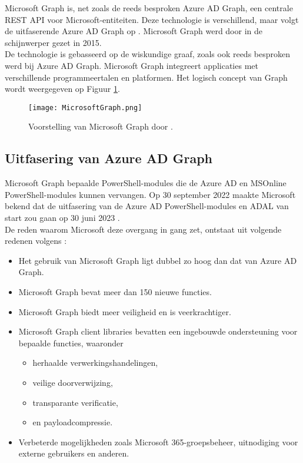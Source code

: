 Microsoft Graph is, net zoals de reeds besproken Azure \Ac{AD} Graph, een centrale \ac{REST} \ac{API} voor Microsoft-entiteiten. Deze technologie is verschillend, maar volgt de uitfaserende Azure \ac{AD} Graph op \autocite{Microsoft2023n}. Microsoft Graph werd door \textcite{Microsoft2015a} in de schijnwerper gezet in 2015. \\

De technologie is gebasseerd op de wiskundige graaf, zoals ook reeds besproken werd bij Azure \Ac{AD} Graph. Microsoft Graph integreert applicaties met verschillende programmeertalen en platformen. Het logisch concept van Graph wordt weergegeven op Figuur \ref{msg}.

\begin{figure}[h]
    \texttt{[image: MicrosoftGraph.png]}
    \caption[Voorbeeld Microsoft Graph]{Voorstelling van Microsoft Graph door \textcite{Microsoft2023d}.}
    \label{msg}
\end{figure}

\subsection{Uitfasering van Azure AD Graph}
 
Microsoft Graph bepaalde PowerShell-modules die de Azure \ac{AD} en MSOnline PowerShell-modules kunnen vervangen. Op 30 september 2022 maakte Microsoft bekend dat de uitfasering van de Azure \ac{AD} PowerShell-modules en \ac{ADAL} van start zou gaan op 30 juni 2023 \autocite{Sahay2022}. \\

De reden waarom Microsoft deze overgang in gang zet, ontstaat uit volgende redenen volgens \textcite{Microsoft2023e}:

\begin{itemize}
    \item Het gebruik van Microsoft Graph ligt dubbel zo hoog dan dat van Azure \ac{AD} Graph.
    \item Microsoft Graph bevat meer dan 150 nieuwe functies.
    \item Microsoft Graph biedt meer veiligheid en is veerkrachtiger.
    \item Microsoft Graph client libraries bevatten een ingebouwde ondersteuning voor bepaalde functies, waaronder
    \begin{itemize}
        \item herhaalde verwerkingshandelingen,
        \item veilige doorverwijzing,
        \item transparante verificatie,
        \item en payloadcompressie.
    \end{itemize}
    \item Verbeterde mogelijkheden zoals Microsoft 365-groepsbeheer, uitnodiging voor externe gebruikers en anderen.
\end{itemize} 

